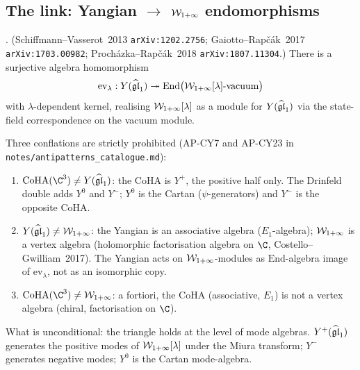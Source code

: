 \subsection{The link: Yangian $\to$ $\mathcal{W}_{1+\infty}$ endomorphisms}
\label{opus:sec:yangian-to-Winf}

\begin{theorem}
\label{opus:thm:yangian-to-Winf}
\ClaimStatusTheorem. (Schiffmann--Vasserot~2013 \texttt{arXiv:1202.2756};
Gaiotto--Rap\v c\'ak~2017 \texttt{arXiv:1703.00982};
Proch\'azka--Rap\v c\'ak~2018 \texttt{arXiv:1807.11304}.)
There is a surjective algebra homomorphism
\[
 \mathrm{ev}_\lambda : Y(\widehat{\mathfrak{gl}}_1) \twoheadrightarrow \mathrm{End}\bigl(\mathcal{W}_{1+\infty}[\lambda]\text{-vacuum}\bigr)
\]
with $\lambda$-dependent kernel, realising $\mathcal{W}_{1+\infty}[\lambda]$ as a module for $Y(\widehat{\mathfrak{gl}}_1)$
via the state-field correspondence on the vacuum module.
\end{theorem}

\begin{remark}
\label{opus:rem:programme-separations}
Three conflations are strictly prohibited (AP-CY7 and AP-CY23 in
\texttt{notes/antipatterns\_catalogue.md}):
\begin{enumerate}
\item $\CoHA(\C^3) \neq Y(\gghone)$: the CoHA is $Y^+$, the positive half only. The
Drinfeld double adds $Y^0$ and $Y^-$; $Y^0$ is the Cartan ($\psi$-generators) and
$Y^-$ is the opposite CoHA.
\item $Y(\widehat{\mathfrak{gl}}_1) \neq \mathcal{W}_{1+\infty}$: the Yangian is an associative algebra
($E_1$-algebra); $\mathcal{W}_{1+\infty}$ is a vertex algebra (holomorphic factorisation algebra
on $\C$, Costello--Gwilliam~2017). The Yangian acts on $\mathcal{W}_{1+\infty}$-modules as
$\mathrm{End}$-algebra image of $\mathrm{ev}_\lambda$, not as an isomorphic copy.
\item $\CoHA(\C^3) \neq \Wilpha$: a fortiori, the CoHA (associative, $E_1$) is not
a vertex algebra (chiral, factorisation on $\C$).
\end{enumerate}
What is unconditional: the triangle holds at the level of mode algebras. $Y^+(\widehat{\mathfrak{gl}}_1)$
generates the positive modes of $\mathcal{W}_{1+\infty}[\lambda]$ under the Miura transform; $Y^-$
generates negative modes; $Y^0$ is the Cartan mode-algebra.
\end{remark}

